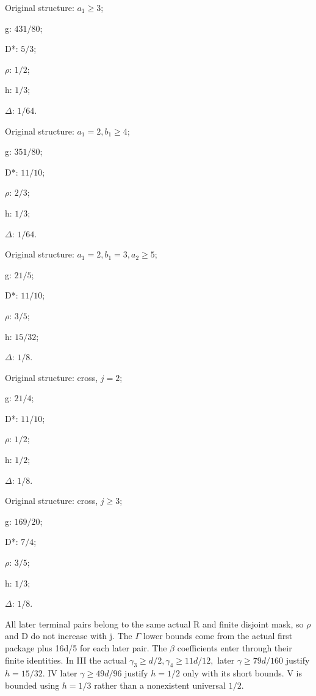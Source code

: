 \begin{description}[style=nextline,leftmargin=1.6em,before=\raggedright]
\item[{I}] Original structure: \(a_{1}\ge 3\);\par\noindent g: \(431/80\);\par\noindent D*: \(5/3\);\par\noindent \(\rho\): \(1/2\);\par\noindent h: \(1/3\);\par\noindent \(\Delta\): \(1/64\).
\item[{II}] Original structure: \(a_{1}=2,\allowbreak \allowbreak  b_1\ge 4\);\par\noindent g: \(351/80\);\par\noindent D*: \(11/10\);\par\noindent \(\rho\): \(2/3\);\par\noindent h: \(1/3\);\par\noindent \(\Delta\): \(1/64\).
\item[{III}] Original structure: \(a_{1}=2,\allowbreak \allowbreak  b_1=3,\allowbreak \allowbreak  a_{2}\ge 5\);\par\noindent g: \(21/5\);\par\noindent D*: \(11/10\);\par\noindent \(\rho\): \(3/5\);\par\noindent h: \(15/32\);\par\noindent \(\Delta\): \(1/8\).
\item[{IV}] Original structure: cross, \(j=2\);\par\noindent g: \(21/4\);\par\noindent D*: \(11/10\);\par\noindent \(\rho\): \(1/2\);\par\noindent h: \(1/2\);\par\noindent \(\Delta\): \(1/8\).
\item[{V}] Original structure: cross, \(j\ge 3\);\par\noindent g: \(169/20\);\par\noindent D*: \(7/4\);\par\noindent \(\rho\): \(3/5\);\par\noindent h: \(1/3\);\par\noindent \(\Delta\): \(1/8\).
\end{description}

All later terminal pairs belong to the same actual R and finite disjoint mask, so \(\rho\) and D do not increase with j. The \(\Gamma\) lower bounds come from the actual first package plus 16d/5 for each later pair. The \(\beta\) coefficients enter through their finite identities. In III the actual \(\gamma_{3}\ge d/2,\allowbreak \allowbreak   \gamma_{4}\ge 11d/12,\allowbreak \allowbreak  \) later \(\gamma\ge 79d/160\) justify \(h=15/32.\) IV later \(\gamma\ge 49d/96\) justify \(h=1/2\) only with its short bounds. V is bounded using \(h=1/3\) rather than a nonexistent universal \(1/2.\)

